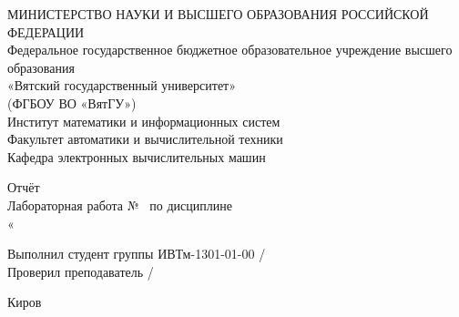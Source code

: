 \begin{titlepage}
    \thispagestyle{empty} %

    \begin{center}
        МИНИСТЕРСТВО НАУКИ И ВЫСШЕГО ОБРАЗОВАНИЯ РОССИЙСКОЙ ФЕДЕРАЦИИ \\
        Федеральное государственное бюджетное образовательное учреждение высшего образования \\
        «Вятский государственный университет» \\
        (ФГБОУ ВО «ВятГУ») \\
        Институт математики и информационных систем \\
        Факультет автоматики и вычислительной техники \\
        Кафедра электронных вычислительных машин

        \vspace*{35mm}

        Отчёт \\
        Лабораторная работа № \labNumber \  по дисциплине \\
        «\subject»

        \vspace*{5mm}

        \vspace*{11mm}


        Выполнил студент группы ИВТм-1301-01-00  \underline{\hspace{18mm}}/\student \\[1ex]
        Проверил преподаватель \underline{\hspace{18mm}}/\teacher

    \end{center}

    \vfill  %

    \begin{center}
        Киров \currentYear
    \end{center}
\end{titlepage}
